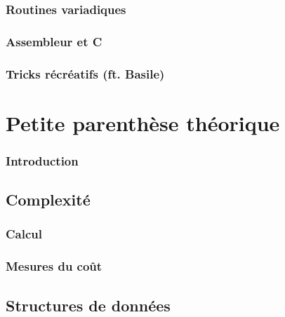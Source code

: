 \documentclass{minitelreport}
\begin{document}
\begin{refsection}
		\section{Routines variadiques}
			\label{sec:routines_variadiques}
			
		\section{Assembleur et C}
			\label{sec:assembleur_et_c}
			
		\section{Tricks récréatifs (ft. Basile)}
			\label{sec:tricks_r_cr_atifs_ft_basile_}
			
\part{Petite parenthèse théorique}
\label{part:petite_parenthèse_théorique}
	\section*{Introduction}
	
	\chapter{Complexité}
	\label{cha:complexite}
		\section{Calcul}
			\label{sec:calcul}
			
		\section{Mesures du coût} %
			\label{sec:mesures_du_cout}
			
	\chapter{Structures de données}
	\label{cha:structures_de_donn_es_classiques}

\end{refsection}
\end{document}

